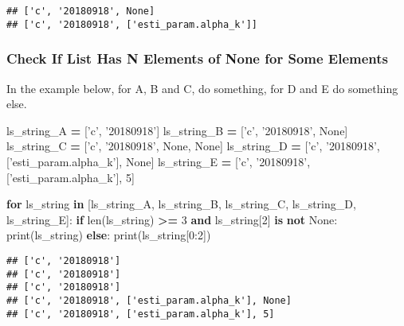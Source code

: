 \documentclass[
]{book}
\newenvironment{Shaded}{\begin{snugshade}}{\end{snugshade}}
\newcommand{\BuiltInTok}[1]{#1}
\newcommand{\ControlFlowTok}[1]{\textcolor[rgb]{0.13,0.29,0.53}{\textbf{#1}}}
\newcommand{\DecValTok}[1]{\textcolor[rgb]{0.00,0.00,0.81}{#1}}
\newcommand{\KeywordTok}[1]{\textcolor[rgb]{0.13,0.29,0.53}{\textbf{#1}}}
\newcommand{\NormalTok}[1]{#1}
\newcommand{\OperatorTok}[1]{\textcolor[rgb]{0.81,0.36,0.00}{\textbf{#1}}}
\newcommand{\StringTok}[1]{\textcolor[rgb]{0.31,0.60,0.02}{#1}}
\newcommand{\VariableTok}[1]{\textcolor[rgb]{0.00,0.00,0.00}{#1}}
\begin{document}
\begin{verbatim}
## ['c', '20180918', None]
## ['c', '20180918', ['esti_param.alpha_k']]
\end{verbatim}

\hypertarget{check-if-list-has-n-elements-of-none-for-some-elements}{%
\subsubsection{Check If List Has N Elements of None for Some Elements}\label{check-if-list-has-n-elements-of-none-for-some-elements}}

In the example below, for A, B and C, do something, for D and E do something else.

\begin{Shaded}
\begin{Highlighting}[]
\NormalTok{ls_string_A }\OperatorTok{=}\NormalTok{ [}\StringTok{'c'}\NormalTok{, }\StringTok{'20180918'}\NormalTok{]}
\NormalTok{ls_string_B }\OperatorTok{=}\NormalTok{ [}\StringTok{'c'}\NormalTok{, }\StringTok{'20180918'}\NormalTok{, }\VariableTok{None}\NormalTok{]}
\NormalTok{ls_string_C }\OperatorTok{=}\NormalTok{ [}\StringTok{'c'}\NormalTok{, }\StringTok{'20180918'}\NormalTok{, }\VariableTok{None}\NormalTok{, }\VariableTok{None}\NormalTok{]}
\NormalTok{ls_string_D }\OperatorTok{=}\NormalTok{ [}\StringTok{'c'}\NormalTok{, }\StringTok{'20180918'}\NormalTok{, [}\StringTok{'esti_param.alpha_k'}\NormalTok{], }\VariableTok{None}\NormalTok{]}
\NormalTok{ls_string_E }\OperatorTok{=}\NormalTok{ [}\StringTok{'c'}\NormalTok{, }\StringTok{'20180918'}\NormalTok{, [}\StringTok{'esti_param.alpha_k'}\NormalTok{], }\DecValTok{5}\NormalTok{]}

\ControlFlowTok{for}\NormalTok{ ls_string }\KeywordTok{in}\NormalTok{ [ls_string_A, ls_string_B, ls_string_C, ls_string_D, ls_string_E]:}
  \ControlFlowTok{if} \BuiltInTok{len}\NormalTok{(ls_string) }\OperatorTok{>=} \DecValTok{3} \KeywordTok{and}\NormalTok{ ls_string[}\DecValTok{2}\NormalTok{] }\KeywordTok{is} \KeywordTok{not} \VariableTok{None}\NormalTok{:}
    \BuiltInTok{print}\NormalTok{(ls_string)}
  \ControlFlowTok{else}\NormalTok{:}
    \BuiltInTok{print}\NormalTok{(ls_string[}\DecValTok{0}\NormalTok{:}\DecValTok{2}\NormalTok{])}
  
\end{Highlighting}
\end{Shaded}

\begin{verbatim}
## ['c', '20180918']
## ['c', '20180918']
## ['c', '20180918']
## ['c', '20180918', ['esti_param.alpha_k'], None]
## ['c', '20180918', ['esti_param.alpha_k'], 5]
\end{verbatim}
\end{document}
